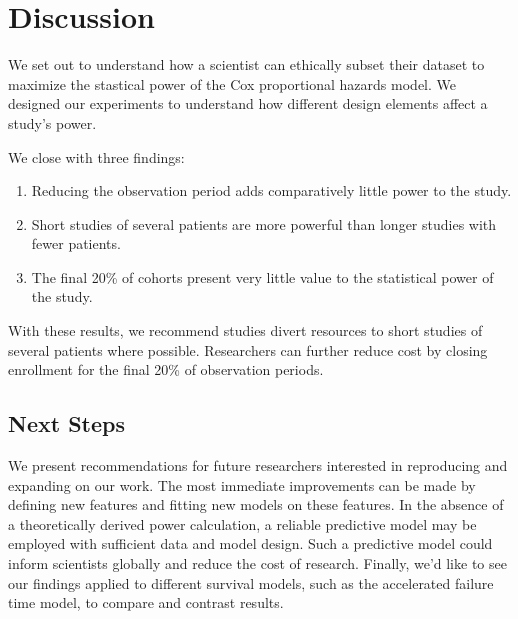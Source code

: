 \section{Discussion}

We set out to understand how a scientist can ethically subset their dataset to maximize the stastical power of the Cox proportional hazards model. We designed our experiments to understand how different design elements affect a study's power. 

We close with three findings:
%
\begin{enumerate}
    \item Reducing the observation period adds comparatively little power to the study.
    \item Short studies of several patients are more powerful than longer studies with fewer patients. 
    \item The final 20\% of cohorts present very little value to the statistical power of the study. 
\end{enumerate}
%
With these results, we recommend studies divert resources to short studies of several patients where possible. Researchers can further reduce cost by closing enrollment for the final 20\% of observation periods. 

\subsection{Next Steps}

We present recommendations for future researchers interested in reproducing and expanding on our work. The most immediate improvements can be made by defining new features and fitting new models on these features. In the absence of a theoretically derived power calculation, a reliable predictive model may be employed with sufficient data and model design. Such a predictive model could inform scientists globally and reduce the cost of research. Finally, we'd like to see our findings applied to different survival models, such as the accelerated failure time model, to compare and contrast results. 
